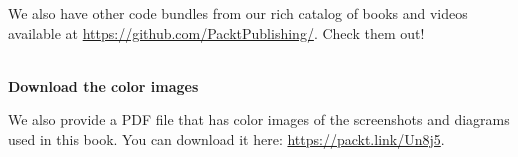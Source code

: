 We also have other code bundles from our rich catalog of books and videos available at \url{https://github.com/PacktPublishing/}. Check them out!


\hspace*{\fill} \\ %
\noindent
\textbf{Download the color images}

We also provide a PDF file that has color images of the screenshots and diagrams used in this book. You can download it here: \url{https://packt.link/Un8j5}.








